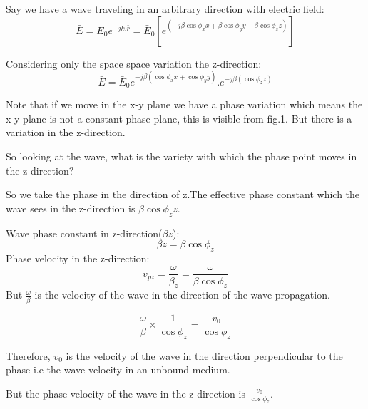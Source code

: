 Say we have a wave traveling in an arbitrary direction with electric field:
\begin{equation}
\bar{E} = E_0 e^{-j\bar{k}.\bar{r}} = \bar{E}_0[e^{(-j\beta\cos\phi_{x}x + \beta\cos\phi_{y}y + \beta\cos\phi_{z}z)}]
\end{equation}

Considering only the space space variation the z-direction:
\begin{equation}
\bar{E} = \bar{E}_0 e^{-j\beta(\cos\phi_{x}x + \cos\phi_{y}y)}.e^{-j\beta(\cos\phi_{z}z)}
\end{equation}

Note that if we move in the x-y plane we have a phase variation which means the x-y plane is not a constant phase plane, this is visible from fig.1. But there is a variation in the z-direction.

So looking at the wave, what is the variety with which the phase point moves in the z-direction?

So we take the phase in the direction of z.The effective phase constant which the wave sees in the z-direction is $\beta\cos\phi_{z}z$.

Wave phase constant in z-direction($\beta z$):
\begin{equation}
\beta z = \beta\cos\phi_{z}
\end{equation}
Phase velocity in the z-direction:
\begin{equation}
v_{pz} = \frac{\omega}{\beta_z} = \frac{\omega}{\beta\cos\phi_{z}}
\end{equation}
But $\frac{\omega}{\beta}$ is the velocity of the wave in the direction of the wave propagation.

\begin{equation}
\frac{\omega}{\beta}\times \frac{1}{\cos\phi_{z}} = \frac{v_0}{\cos\phi_{z}}
\end{equation}

Therefore, $v_0$ is the velocity of the wave in the direction perpendicular to the phase i.e the wave velocity in an unbound medium.

But the phase velocity of the wave in the z-direction is $\frac{v_0}{\cos\phi_{z}}$.

